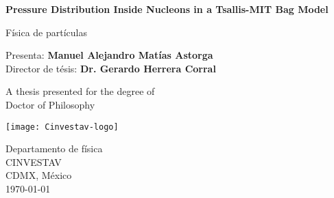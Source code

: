 \begin{titlepage}
    \begin{center}
        \vspace*{1cm}
        
        \Huge
        \textbf{Pressure Distribution Inside Nucleons in a Tsallis-MIT Bag Model}
        
        \vspace{0.5cm}
        \LARGE
        Física de partículas
        
        \vspace{1.5cm}
        
        Presenta: \textbf{Manuel Alejandro Matías Astorga} \\
        Director de tésis: \textbf{Dr. Gerardo Herrera Corral}
        
        \vfill
        
        A thesis presented for the degree of\\
        Doctor of Philosophy
        
        \vspace{0.8cm}
        
        \texttt{[image: Cinvestav-logo]}
        
        \Large
        Departamento de física\\
        CINVESTAV\\
        CDMX, México\\
        \today
        
    \end{center}
\end{titlepage}